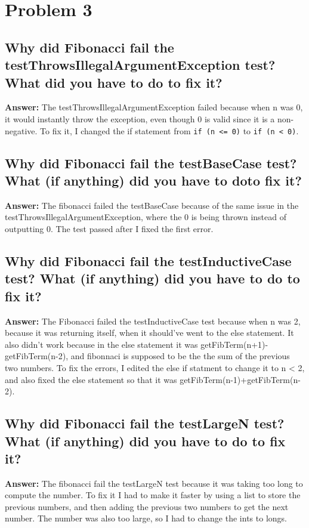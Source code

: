 \documentclass[11pt]{article}
\begin{document}
\section{Problem 3}

\subsection{Why did Fibonacci fail the testThrowsIllegalArgumentException test? What did you have to do to fix it?}
\textbf{Answer:}
The testThrowsIllegalArgumentException failed because when n was 0, it would instantly throw the exception, even though 0 is valid since it is a non-negative. To fix it, 
I changed the if statement from \texttt{if (n <= 0)} to \texttt{if (n < 0)}.

\subsection{Why did Fibonacci fail the testBaseCase test? What (if anything) did you have to doto fix it?}
\textbf{Answer:}
The fibonacci failed the testBaseCase because of the same issue in the testThrowsIllegalArgumentException, where the 0 is being thrown instead of outputting 0. 
The test passed after I fixed the first error.

\subsection{Why did Fibonacci fail the testInductiveCase test? What (if anything) did you have to do to fix it?}
\textbf{Answer:}
The Fibonacci failed the testInductiveCase test because when n was 2, because it was returning itself, when it should've went to the else statement. It also didn't work because
in the else statement it was getFibTerm(n+1)-getFibTerm(n-2), and fibonnaci is supposed to be the the sum of the previous two numbers. 
To fix the errors, I edited the else if statment to change it to n < 2, and also fixed the else statement so that it was getFibTerm(n-1)+getFibTerm(n-2).

\subsection{Why did Fibonacci fail the testLargeN test? What (if anything) did you have to do to fix it?}
\textbf{Answer:}
The fibonacci fail the testLargeN test because it was taking too long to compute the number.
To fix it I had to make it faster by using a list to store the previous numbers, and then adding the previous two numbers to get the next number. The number was also too large, so I had to change the ints to longs.
\end{document}
